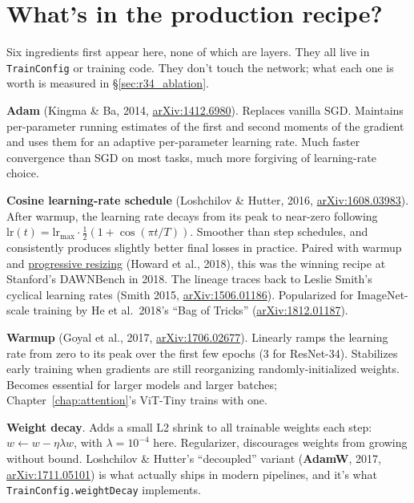 \section{What's in the production recipe?}
\label{sec:r34_recipe}

Six ingredients first appear here, none of which are layers. They
all live in \texttt{TrainConfig} or training code. They don't touch
the network; what each one is worth is measured in \S\ref{sec:r34_ablation}.

\textbf{Adam} (Kingma \& Ba, 2014,
\href{https://arxiv.org/abs/1412.6980}{arXiv:1412.6980}). Replaces
vanilla SGD. Maintains
per-parameter running estimates of the first and second moments of
the gradient and uses them for an adaptive per-parameter learning
rate. Much faster convergence than SGD on most tasks, much more
forgiving of learning-rate choice.

\textbf{Cosine learning-rate schedule} (Loshchilov \& Hutter, 2016,
\href{https://arxiv.org/abs/1608.03983}{arXiv:1608.03983}).
After warmup, the learning rate decays from its peak to near-zero
following $\mathrm{lr}(t) = \mathrm{lr}_{\max} \cdot \tfrac{1}{2}(1 +
\cos(\pi t / T))$. Smoother than step schedules, and consistently produces
slightly better final losses in practice. Paired with warmup and
\href{https://www.fast.ai/posts/2018-04-30-dawnbench-fastai.html}{progressive
resizing} (Howard et al., 2018), this was the winning recipe at
Stanford's DAWNBench in 2018. The lineage traces back to Leslie
Smith's cyclical learning rates (Smith 2015,
\href{https://arxiv.org/abs/1506.01186}{arXiv:1506.01186}).
Popularized for ImageNet-scale training by He et al.\ 2018's
``Bag of Tricks''
(\href{https://arxiv.org/abs/1812.01187}{arXiv:1812.01187}).

\textbf{Warmup} (Goyal et al., 2017,
\href{https://arxiv.org/abs/1706.02677}{arXiv:1706.02677}). Linearly
ramps the learning rate from zero to its
peak over the first few epochs (3 for ResNet-34). Stabilizes early
training when gradients are still reorganizing randomly-initialized
weights. Becomes essential for larger models and larger batches;
Chapter~\ref{chap:attention}'s ViT-Tiny trains with one.

\textbf{Weight decay}. Adds a small L2 shrink to all trainable weights
each step: $w \leftarrow w - \eta \lambda w$, with $\lambda = 10^{-4}$
here. Regularizer, discourages
weights from growing without bound. Loshchilov \& Hutter's
``decoupled'' variant (\textbf{AdamW}, 2017,
\href{https://arxiv.org/abs/1711.05101}{arXiv:1711.05101}) is what
actually ships in modern
pipelines, and it's what \texttt{TrainConfig.weightDecay} implements.

